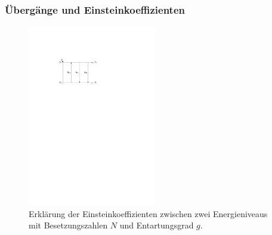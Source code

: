 \documentclass[11pt, a4paper]{article}
\numberwithin{equation}{section}
\begin{document}
\subsubsection{Übergänge und Einsteinkoeffizienten}
\begin{figure}[h]
	\centering
	\includegraphics[width=0.5\textwidth]{./figures/einsteinkoeffizienten.pdf}
	\caption{Erklärung der Einsteinkoeffizienten zwischen zwei Energieniveaus mit Besetzungszahlen $N$ und Entartungsgrad $g$.}
	\label{fig:einsteinkoeff}
\end{figure}
\end{document}
